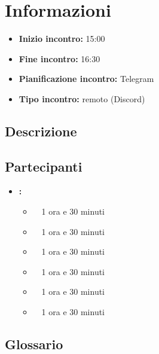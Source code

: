 \section{Informazioni}
\begin{itemize}
	\item \textbf{Inizio incontro:} 15:00
	\item \textbf{Fine incontro:} 16:30
	\item \textbf{Pianificazione incontro:} Telegram
	\item \textbf{Tipo incontro:} remoto (Discord)
\end{itemize}

\subsection{Descrizione}
\DocDescription

\subsection{Partecipanti}

\begin{itemize}
	\item \textbf{\GroupName:}
	\begin{itemize}
		\item \tommaso \ \rightarrow\ 1 ora e 30 minuti
		\item \marco \ \rightarrow\ 1 ora e 30 minuti
		\item \riccardo \ \rightarrow\ 1 ora e 30 minuti
		\item \raul \ \rightarrow\ 1 ora e 30 minuti
		\item \martina \ \rightarrow\ 1 ora e 30 minuti
		\item \sebastiano \ \rightarrow\ 1 ora e 30 minuti
	\end{itemize}
\end{itemize}

\subsection{Glossario}
\GlossarioIntroduzione

\clearpage